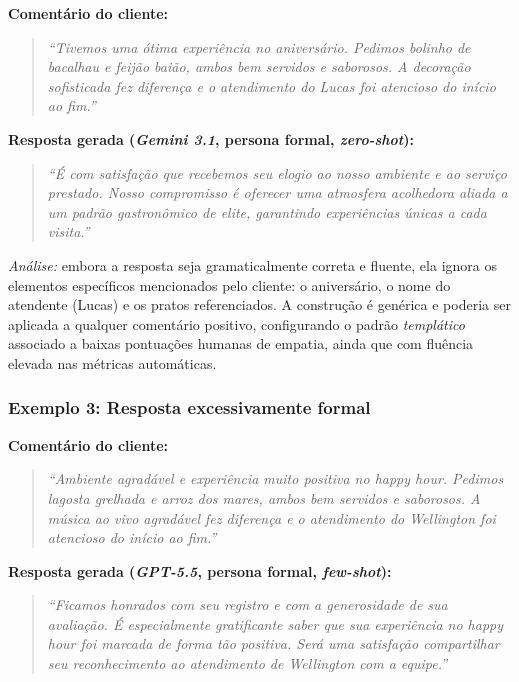 \documentclass[12pt, a4paper]{article}
\numberwithin{equation}{section}
\begin{document}
 \noindent\textbf{Comentário do cliente:}
 \begin{quote}
 \textit{``Tivemos uma ótima experiência no aniversário. Pedimos bolinho de bacalhau e feijão 
baião, ambos bem servidos e saborosos. A decoração sofisticada fez diferença e o atendimento do 
Lucas foi atencioso do início ao fim.''}
 \end{quote}
 
 \noindent\textbf{Resposta gerada (\textit{Gemini 3.1}, persona formal, \textit{zero-shot}):}
 \begin{quote}
 \textit{``É com satisfação que recebemos seu elogio ao nosso ambiente e ao serviço prestado. 
Nosso compromisso é oferecer uma atmosfera acolhedora aliada a um padrão gastronômico de elite, 
garantindo experiências únicas a cada visita.''}
 \end{quote}
 
 \noindent\textit{Análise:} embora a resposta seja gramaticalmente correta e fluente, ela ignora 
os elementos específicos mencionados pelo cliente: o aniversário, o nome do atendente (Lucas) e os
 pratos referenciados. A construção é genérica e poderia ser aplicada a qualquer comentário 
positivo, configurando o padrão \textit{templático} associado a baixas pontuações humanas de 
empatia, ainda que com fluência elevada nas métricas automáticas.
 
 \subsubsection*{Exemplo 3: Resposta excessivamente formal}
 
 \noindent\textbf{Comentário do cliente:}
 \begin{quote}
 \textit{``Ambiente agradável e experiência muito positiva no happy hour. Pedimos lagosta grelhada
 e arroz dos mares, ambos bem servidos e saborosos. A música ao vivo agradável fez diferença e o 
atendimento do Wellington foi atencioso do início ao fim.''}
 \end{quote}
 
 \noindent\textbf{Resposta gerada (\textit{GPT-5.5}, persona formal, \textit{few-shot}):}
 \begin{quote}
 \textit{``Ficamos honrados com seu registro e com a generosidade de sua avaliação. É 
especialmente gratificante saber que sua experiência no happy hour foi marcada de forma tão 
positiva. Será uma satisfação compartilhar seu reconhecimento ao atendimento de Wellington com a 
equipe.''}
 \end{quote}
 
\end{document}

